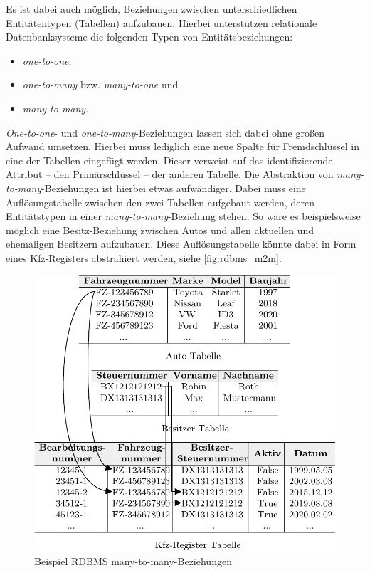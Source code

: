 Es ist dabei auch möglich, Beziehungen zwischen unterschiedlichen Entitätentypen (Tabellen) aufzubauen. Hierbei unterstützen relationale Datenbanksysteme die folgenden Typen von Entitätsbeziehungen: 
\begin{itemize}
    \item \textit{one-to-one}, 
    \item \textit{one-to-many} bzw. \textit{many-to-one} und 
    \item \textit{many-to-many}.
\end{itemize}
\textit{One-to-one}- und \textit{one-to-many}-Beziehungen lassen sich dabei ohne großen Aufwand umsetzen. Hierbei muss lediglich eine neue Spalte für Fremdschlüssel in eine der Tabellen eingefügt werden. Dieser verweist auf das identifizierende Attribut -- den Primärschlüssel -- der anderen Tabelle. Die Abstraktion von \textit{many-to-many}-Beziehungen ist hierbei etwas aufwändiger. Dabei muss eine Auflösungstabelle zwischen den zwei Tabellen aufgebaut werden, deren Entitätstypen in einer \textit{many-to-many}-Beziehung stehen. So wäre es beispielsweise möglich eine Besitz-Beziehung zwischen Autos und allen aktuellen und ehemaligen Besitzern aufzubauen. Diese Auflösungstabelle könnte dabei in Form eines Kfz-Registers abstrahiert werden, siehe \autoref{fig:rdbms_m2m}.

\begin{figure}[h]
    \centering
    \includegraphics[width=\textwidth]{images/many-to-many.pdf}
    \caption{Beispiel RDBMS many-to-many-Beziehungen}
    \label{fig:rdbms_m2m}
\end{figure}

